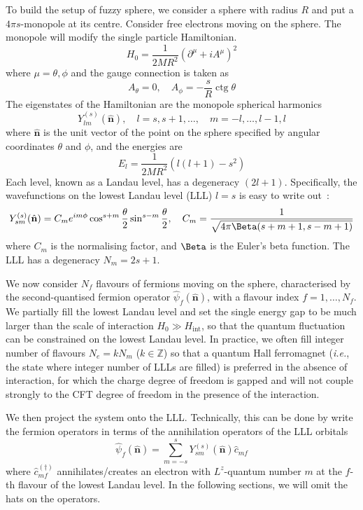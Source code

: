 \documentclass{timesjhep}
\begin{document}
To build the setup of fuzzy sphere, we consider a sphere with radius $R$ and put a $4\pi s$-monopole at its centre. Consider free electrons moving on the sphere. The monopole will modify the single particle Hamiltonian. \begin{equation}
    H_0=\frac{1}{2MR^2}(\partial^\mu+iA^\mu)^2
\end{equation} where $\mu=\theta,\phi$ and the gauge connection is taken as
\begin{equation}
    A_\theta=0,\quad A_\phi=-\frac{s}{R}\operatorname{ctg}\theta
\end{equation}
The eigenstates of the Hamiltonian are the monopole spherical harmonics 
\begin{equation}
    Y_{lm}^{(s)}(\hat{\mathbf{n}}),\quad l=s,s+1,\dots,\quad m=-l,\dots,l-1,l
\end{equation}
where $\hat{\mathbf{n}}$ is the unit vector of the point on the sphere specified by angular coordinates $\theta$ and $\phi$, and the energies are
\begin{equation}
    E_l=\frac{1}{2MR^2}(l(l+1)-s^2)
\end{equation}
Each level, known as a Landau level, has a degeneracy $(2l+1)$. Specifically, the wavefunctions on the lowest Landau level (LLL) $l=s$ is easy to write out~: 
\begin{equation}
    Y_{sm}^{(s)}(\hat{\mathbf{n}})=C_me^{im\phi}\cos^{s+m}\frac{\theta}{2}\sin^{s-m}\frac{\theta}{2},\quad C_m=\frac{1}{{\sqrt{4\pi\Beta(s+m+1,s-m+1)}}}
\end{equation}
where $C_m$ is the normalising factor, and $\Beta$ is the Euler's beta function. The LLL has a degeneracy $N_m=2s+1$. 

We now consider $N_f$ flavours of fermions moving on the sphere, characterised by the second-quantised fermion operator $\hat{\psi}_f(\hat{\mathbf{n}})$, with a flavour index $f=1,\dots,N_f$. We partially fill the lowest Landau level and set the single energy gap to be much larger than the scale of interaction $H_0\gg H_\mathrm{int}$, so that the quantum fluctuation can be constrained on the lowest Landau level. In practice, we often fill integer number of flavours $N_e=kN_m$ ($k\in\mathbb{Z}$) so that a quantum Hall ferromagnet (\textit{i.e.}, the state where integer number of LLLs are filled) is preferred in the absence of interaction, for which the charge degree of freedom is gapped and will not couple strongly to the CFT degree of freedom in the presence of the interaction. 

We then project the system onto the LLL. Technically, this can be done by write the fermion operators in terms of the annihilation operators of the LLL orbitals
\begin{equation}
    \hat{\psi}_f(\hat{\mathbf{n}})=\sum_{m=-s}^s Y^{(s)}_{sm}(\hat{\mathbf{n}})\hat{c}_{mf}
\end{equation} 
where $\hat{c}^{(\dagger)}_{mf}$ annihilates/creates an electron with $L^z$-quantum number $m$ at the $f$-th flavour of the lowest Landau level. In the following sections, we will omit the hats on the operators. 
\end{document}
